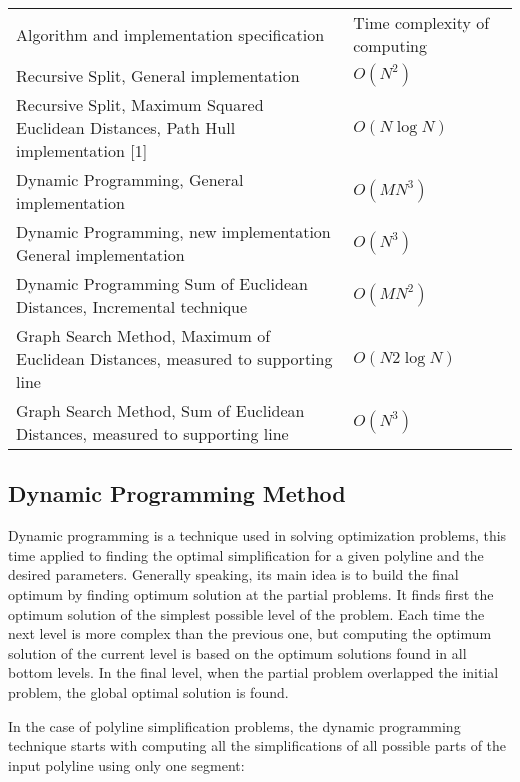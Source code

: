 \begin{tabularx}{10cm}{|L|L}
Algorithm and implementation specification &  Time complexity of computing \\ 
Recursive Split, \cite{dp-arnpr-73}
General implementation                     &  $O(N^2)$ \\
Recursive Split, 
Maximum Squared Euclidean Distances, Path Hull implementation [1]
                                           & $O(N \log N)$ \\
Dynamic Programming, \cite{cgal:gt-dpasrcp-93}
General implementation
                                           & $O(MN^3)$ \\
Dynamic Programming, new implementation
General implementation                     & $O(N^3)$\\

Dynamic Programming 
Sum of Euclidean Distances, Incremental technique \cite{cgal:pv-opadc-94}
                                           & $O(MN^2)$ \\
Graph Search Method, \cite{cgal:ii-pac}
Maximum of Euclidean Distances, measured to supporting line
                                           & $O(N2\log N)$ \\
Graph Search Method, 
Sum of Euclidean Distances, measured to supporting line
                                           & $O(N^3)$\\
\end{tabularx}


\subsection{Dynamic Programming Method}

Dynamic programming is a technique used in solving optimization
problems, this time applied to finding the optimal simplification
for a given polyline and the desired
parameters. Generally speaking, its main idea is to build the final
optimum by finding optimum solution at the partial problems. It finds
first the optimum solution of the simplest possible level of the
problem. Each time the next level is more complex than the previous
one, but computing the optimum solution of the current level is based
on the optimum solutions found in all bottom levels. In the final
level, when the partial problem overlapped the initial problem, the
global optimal solution is found.

In the case of polyline simplification problems, the dynamic
programming technique starts with computing all the simplifications of
all possible parts of the input polyline using only one segment:

